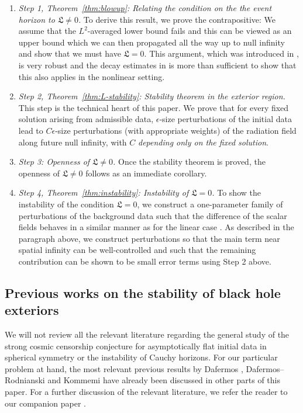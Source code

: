 \documentclass[10pt, reqno]{amsart}
\theoremstyle{definition}
\theoremstyle{remark}
\theoremstyle{conjecture}
\numberwithin{equation}{section}
\newcommand{\0}{\emptyset}
\newcommand{\pfstep}[1]{\vspace{.5em} {\it \noindent #1.}}
\begin{document}
\begin{enumerate}
\item \pfstep{Step 1, Theorem~\ref{thm:blowup}: Relating the condition on the the event horizon to $\mathfrak L\neq 0$} To derive this result, we prove the contrapositive: We assume that the $L^2$-averaged lower bound fails and this can be viewed as an upper bound which we can then propagated all the way up to null infinity and show that we must have $\mathfrak L=0$. This argument, which was introduced in \cite{LO.instab}, is very robust and the decay estimates in \cite{DRPL} is more than sufficient to show that this also applies in the nonlinear setting.
\item \pfstep{Step 2, Theorem~\ref{thm:L-stability}: Stability theorem in the exterior region} This step is the technical heart of this paper. We prove that for every fixed solution arising from admissible data, $\epsilon$-size perturbations of the initial data lead to $C\epsilon$-size perturbations (with appropriate weights) of the radiation field along future null infinity, with $C$ \emph{depending only on the fixed solution}. 
\item \pfstep{Step 3: Openness of $\mathfrak L\neq 0$} Once the stability theorem is proved, the openness of $\mathfrak L\neq 0$ follows as an immediate corollary.
\item \pfstep{Step 4, Theorem~\ref{thm:instability}: Instability of $\mathfrak L=0$} To show the instability of the condition $\mathfrak L=0$, we construct a one-parameter family of perturbations of the background data such that the difference of the scalar fields behaves in a similar manner as for the linear case \cite{LO.instab}. As described in the paragraph above, we construct perturbations so that the main term near spatial infinity can be well-controlled and such that the remaining contribution can be shown to be small error terms using Step 2 above.
\end{enumerate}

\subsection{Previous works on the stability of black hole exteriors}\label{sec.previous.works}

We will not review all the relevant literature regarding the general study of the strong cosmic censorship conjecture for asymptotically flat initial data in spherical symmetry or the instability of Cauchy horizons. For our particular problem at hand, the most relevant previous results by Dafermos \cite{D1, D2, D3}, Dafermos--Rodnianski \cite{DRPL} and Kommemi \cite{KomThe, Kommemi} have already been discussed in other parts of this paper. For a further discussion of the relevant literature, we refer the reader to our companion paper \cite{LO.interior}.
\end{document}
